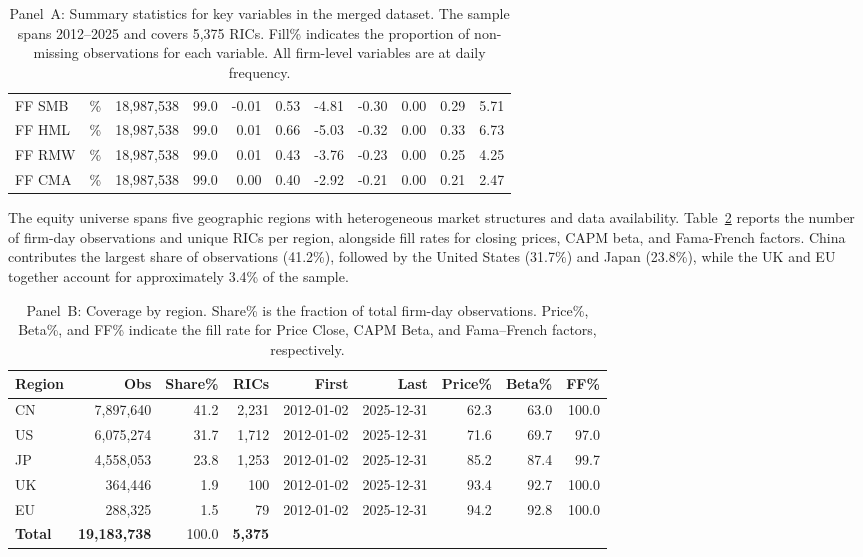 \documentclass{article}
\theoremstyle{plain}
\begin{document}
\begin{table}
\begin{tabular}{l l r r r r r r r r r}
  FF SMB & \% & 18,987,538 & 99.0 & -0.01 & 0.53 & -4.81 & -0.30 & 0.00 & 0.29 & 5.71 \\
  FF HML & \% & 18,987,538 & 99.0 & 0.01 & 0.66 & -5.03 & -0.32 & 0.00 & 0.33 & 6.73 \\
  FF RMW & \% & 18,987,538 & 99.0 & 0.01 & 0.43 & -3.76 & -0.23 & 0.00 & 0.25 & 4.25 \\
  FF CMA & \% & 18,987,538 & 99.0 & 0.00 & 0.40 & -2.92 & -0.21 & 0.00 & 0.21 & 2.47 \\
\bottomrule
\end{tabular}
\caption{Panel~A: Summary statistics for key variables in the merged dataset. The sample spans 2012--2025 and covers 5,375 RICs. Fill\% indicates the proportion of non-missing observations for each variable. All firm-level variables are at daily frequency.}
\label{tab:panel_a}
\end{table}

The equity universe spans five geographic regions with heterogeneous market structures and data availability. Table~\ref{tab:panel_b} reports the number of firm-day observations and unique RICs per region, alongside fill rates for closing prices, CAPM beta, and Fama-French factors. China contributes the largest share of observations (41.2\%), followed by the United States (31.7\%) and Japan (23.8\%), while the UK and EU together account for approximately 3.4\% of the sample.

\begin{table}[!ht]
\centering
\footnotesize
\begin{tabular}{l r r r r r r r r}
\toprule
\textbf{Region} & \textbf{Obs} & \textbf{Share\%} & \textbf{RICs} & \textbf{First} & \textbf{Last} & \textbf{Price\%} & \textbf{Beta\%} & \textbf{FF\%} \\
\midrule
  CN & 7,897,640 & 41.2 & 2,231 & 2012-01-02 & 2025-12-31 & 62.3 & 63.0 & 100.0 \\
  US & 6,075,274 & 31.7 & 1,712 & 2012-01-02 & 2025-12-31 & 71.6 & 69.7 & 97.0 \\
  JP & 4,558,053 & 23.8 & 1,253 & 2012-01-02 & 2025-12-31 & 85.2 & 87.4 & 99.7 \\
  UK & 364,446 & 1.9 & 100 & 2012-01-02 & 2025-12-31 & 93.4 & 92.7 & 100.0 \\
  EU & 288,325 & 1.5 & 79 & 2012-01-02 & 2025-12-31 & 94.2 & 92.8 & 100.0 \\
\midrule
  \textbf{Total} & \textbf{19,183,738} & 100.0 & \textbf{5,375} & & & & & \\
\bottomrule
\end{tabular}
\caption{Panel~B: Coverage by region. Share\% is the fraction of total firm-day observations. Price\%, Beta\%, and FF\% indicate the fill rate for Price Close, CAPM Beta, and Fama--French factors, respectively.}
\label{tab:panel_b}
\end{table}
\end{document}
